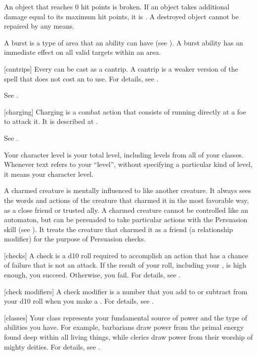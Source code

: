 An object that reaches 0 hit points is broken. If an object takes additional damage equal to its maximum hit points, it is . A destroyed object cannot be repaired by any means.

 A burst is a type of area that an ability can have (see ).
A burst ability has an immediate effect on all valid targets within an area.

[cantrips] Every  can be cast as a cantrip.
A cantrip is a weaker version of the spell that does not cost an  to use.
For details, see .

 See .

[charging] Charging is a combat action that consists of running directly at a foe to attack it.
It is described at .

 See .

 Your character level is your total level, including levels from all of your classes.
Whenever text refers to your ``level'', without specifying a particular kind of level, it means your character level.

 A charmed creature is mentally influenced to like another creature.
It always sees the words and actions of the creature that charmed it in the most favorable way, as a close friend or trusted ally.
A charmed creature cannot be controlled like an automaton, but can be persuaded to take particular actions with the Persuasion skill (see ).
It treats the creature that charmed it as a friend (a  relationship modifier) for the purpose of Persuasion checks.

[checks] A check is a d10 roll required to accomplish an action that has a chance of failure that is not an attack.
If the result of your roll, including your , is high enough, you succeed.
Otherwise, you fail.
For details, see .

[check modifiers] A check modifier is a number that you add to or subtract from your d10 roll when you make a .
For details, see .

[classes] Your class represents your fundamental source of power and the type of abilities you have.
For example, barbarians draw power from the primal energy found deep within all living things, while clerics draw power from their worship of mighty deities.
For details, see .

